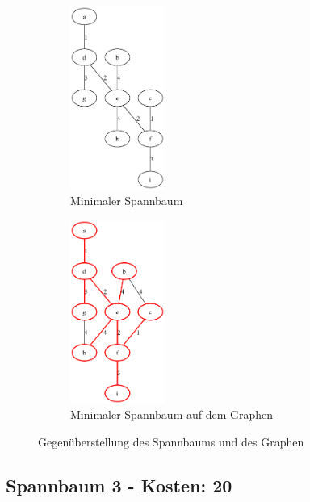 \documentclass[a4paper,11pt]{report}
\begin{document}
    \begin{figure}[htbp]
        \centering
        \begin{subfigure}[b]{0.4\textwidth}
            \centering
            \includegraphics[width=\textwidth, height=6cm, keepaspectratio]{a03a_mst_2}
            \caption{Minimaler Spannbaum}
            \label{fig:a03_mst_02}
        \end{subfigure}
        \begin{subfigure}[b]{0.4\textwidth}
            \centering
            \includegraphics[width=\textwidth, height=6cm, keepaspectratio]{a03a_mst_2_highlighted}
            \caption{Minimaler Spannbaum auf dem Graphen}
            \label{fig:a03_mst_02_highlighted}
        \end{subfigure}
        \caption{Gegenüberstellung des Spannbaums und des Graphen}
        \label{fig:a03_02}
    \end{figure}
    \FloatBarrier

    \subsection{Spannbaum 3 - Kosten: 20}\label{subsec:spannbaum-3---kosten:-20}
\end{document}
